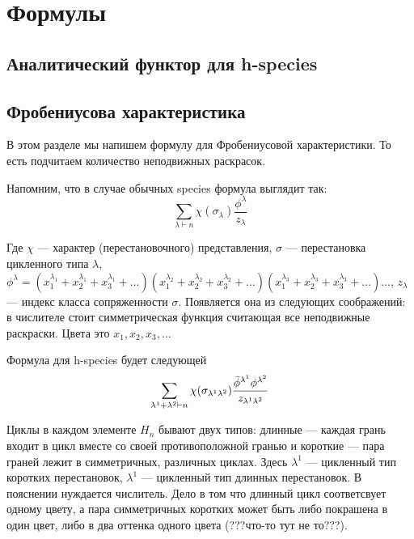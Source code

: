 \section{Формулы}

\subsection{Аналитический функтор для h-species}

\tikzset{node distance=2cm, auto}

\subsection{Фробениусова характеристика}

В этом разделе мы напишем формулу для Фробениусовой характеристики.
То есть подчитаем количество неподвижных раскрасок.

Напомним, что в случае обычных species формула выглядит так:
\begin{equation}
\label{eq:fr}
\sum_{\lambda \vdash n}\chi(\sigma_{\lambda}) \frac{\phi^{\lambda}}{z_{\lambda}}
\end{equation}

Где $\chi$ --- характер (перестановочного) представления, $\sigma$ ---
перестановка цикленного типа $\lambda$, 
$\phi^{\lambda} = 
(x_1^{\lambda_1} + x_2^{\lambda_1} + x_3^{\lambda_1} + \dots)
(x_1^{\lambda_2} + x_2^{\lambda_2} + x_3^{\lambda_2} + \dots)
(x_1^{\lambda_3} + x_2^{\lambda_3} + x_3^{\lambda_3} + \dots)
\dots$,
 $z_\lambda$ --- индекс класса сопряженности $\sigma$.
Появляется она из следующих соображений: в числителе стоит симметрическая
функция считающая все неподвижные раскраски. Цвета это $x_1, x_2, x_3, \dots$

Формула для h-species будет следующей
\begin{equation}
\label{eq:h-fr}
\sum_{\lambda^1 + \lambda^2 \vdash n}\chi(\sigma_{\lambda^1 \lambda^2})
\frac{\Bar{\phi}^{\lambda^1} \phi^{\lambda^2}}{z_{\lambda^1 \lambda^2}}
\end{equation}

Циклы в каждом элементе $H_n$ бывают двух типов:
длинные --- каждая грань входит в цикл вместе со своей противоположной гранью и
короткие --- пара граней лежит в симметричных, различных циклах. Здесь
$\lambda^1$ --- цикленный тип коротких перестановок, $\lambda^1$ --- цикленный тип длинных перестановок.
В пояснении нуждается числитель. Дело в том что длинный цикл соответсвует
одному цвету, а пара симметричных коротких может быть либо покрашена в один
цвет, либо в два оттенка одного цвета (???что-то тут не то???).
